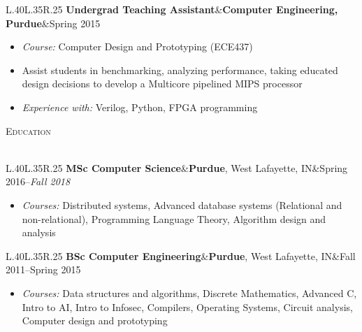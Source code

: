 \documentclass[a4paper]{article}
\newcommand{\header} [1] {
    {\hspace*{-18pt}\vspace*{6pt} \textsc{#1}
    \vspace*{-14pt} \\ \hspace*{-18pt} \hrulefill{} \\
    \vspace{1mm}}
}
\newcommand{\threeparts} [3] {
    {\setlength\tabcolsep{0pt}
    \begin{tabularx}{\linewidth}{L{.40\linewidth}L{.35\linewidth}R{.25\linewidth}} 
    \textbf{#1}&#2&#3
    \end{tabularx}}
}
\begin{document}
\threeparts{Undergrad Teaching Assistant}{\textbf{Computer Engineering, Purdue}}{Spring 2015}
\begin{itemize}[label=$\square$]
	\item \textit{Course:} Computer Design and Prototyping (ECE437)
    \item Assist students in benchmarking, analyzing performance, taking educated design decisions to develop a Multicore pipelined MIPS processor
    \item \textit{Experience with:} Verilog, Python, FPGA programming
\end{itemize}


\header{Education}
\threeparts{MSc Computer Science}{\textbf{Purdue}, West Lafayette, IN}{Spring 2016--\textit{Fall 2018}}
\begin{itemize}[label=$\square$]
	\item \textit{Courses:} Distributed systems, Advanced database systems (Relational and non-relational), Programming Language Theory, Algorithm design and analysis
\end{itemize}
\threeparts{BSc Computer Engineering}{\textbf{Purdue}, West Lafayette, IN}{Fall 2011--Spring 2015}
\begin{itemize}[label=$\square$]
	\item \textit{Courses:} Data structures and algorithms, Discrete Mathematics, Advanced C, Intro to AI, Intro to Infosec, Compilers, Operating Systems, Circuit analysis, Computer design and prototyping
\end{itemize}
\end{document}
